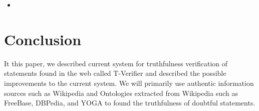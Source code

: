 \documentclass[11pt]{article}
\begin{document}
\begin{itemize}
\item 
\end{itemize}
\section{Conclusion}
It this paper, we described current system for truthfulness verification of statements found in the web called T-Verifier and described the possible improvements to the current system. We will primarily use authentic information sources such as Wikipedia and Ontologies extracted from Wikipedia such as FreeBase, DBPedia, and YOGA to found the truthfulness of doubtful statements.  




\end{document}
